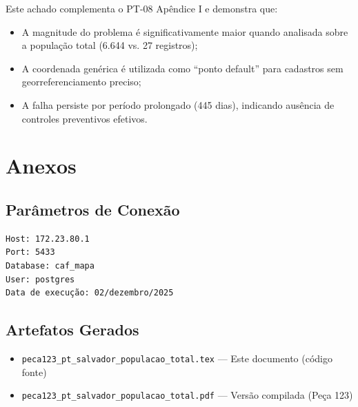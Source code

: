 \documentclass[11pt,a4paper]{article}
\begin{document}
Este achado complementa o PT-08 Apêndice I e demonstra que:

\begin{itemize}
    \item A magnitude do problema é significativamente maior quando analisada sobre
    a população total (6.644 vs. 27 registros);
    \item A coordenada genérica é utilizada como ``ponto default'' para cadastros
    sem georreferenciamento preciso;
    \item A falha persiste por período prolongado (445 dias), indicando ausência
    de controles preventivos efetivos.
\end{itemize}

\section{Anexos}

\subsection{Parâmetros de Conexão}

\begin{verbatim}
Host: 172.23.80.1
Port: 5433
Database: caf_mapa
User: postgres
Data de execução: 02/dezembro/2025
\end{verbatim}

\subsection{Artefatos Gerados}

\begin{itemize}
    \item \texttt{peca123\_pt\_salvador\_populacao\_total.tex} --- Este documento (código fonte)
    \item \texttt{peca123\_pt\_salvador\_populacao\_total.pdf} --- Versão compilada (Peça 123)
\end{itemize}
\end{document}
